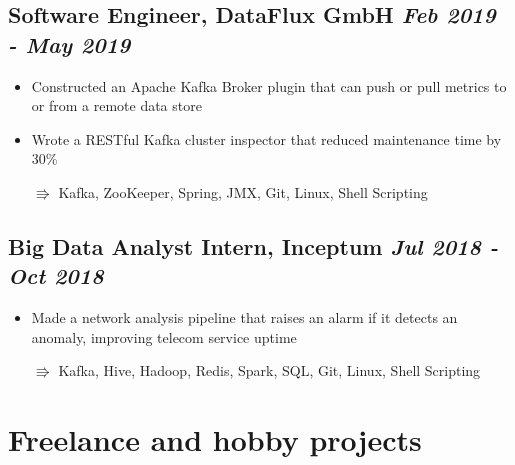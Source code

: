 \documentclass[a4paper]{article}
\newcommand{\bolditalicpair}
[2]
{\textbf{#1} \texorpdfstring{\hfill}{} \textit{#2}}
\begin{document}
\subsection{\bolditalicpair{Software Engineer, DataFlux GmbH}{Feb 2019 - May 2019}}

\begin{itemize}
  \item Constructed an Apache Kafka Broker plugin that can push or pull metrics to or from a remote data store
  \item Wrote a RESTful Kafka cluster inspector that reduced maintenance time by 30\%
  \item[$\Rrightarrow$] Kafka, ZooKeeper, Spring, JMX, Git, Linux, Shell Scripting
\end{itemize}

\subsection{\bolditalicpair{Big Data Analyst Intern, Inceptum}{Jul 2018 - Oct 2018}}

\begin{itemize}
  \item Made a network analysis pipeline that raises an alarm if it detects an anomaly, improving telecom service uptime
  \item[$\Rrightarrow$] Kafka, Hive, Hadoop, Redis, Spark, SQL, Git, Linux, Shell Scripting
\end{itemize}





\section{Freelance and hobby projects}
\end{document}
